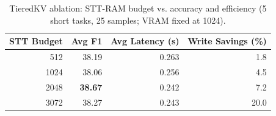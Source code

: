 \begin{table}[h]
\centering
\small
\caption{TieredKV ablation: STT-RAM budget vs. accuracy and efficiency (5 short tasks, 25 samples; VRAM fixed at 1024).}
\label{tab:stt_ablation}
\begin{tabular}{rrrr}
\toprule
\textbf{STT Budget} & \textbf{Avg F1} & \textbf{Avg Latency (s)} & \textbf{Write Savings (\%)} \\
\midrule
512 & 38.19 & 0.263 & 1.8 \\
1024 & 38.06 & 0.256 & 4.5 \\
2048 & \textbf{38.67} & 0.242 & 7.2 \\
3072 & 38.27 & 0.243 & 20.0 \\
\bottomrule
\end{tabular}
\end{table}
